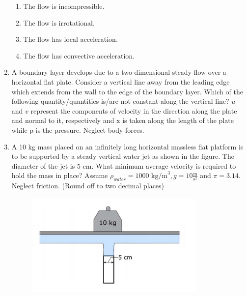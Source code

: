 \documentclass[a4paper,10pt]{article}
\begin{document}
\begin{enumerate}
\hfill{}
\begin{enumerate}
    \item The flow is incompressible.
    \item The flow is irrotational.
    \item The flow has local acceleration.
    \item The flow has convective acceleration.
\end{enumerate}

\item A boundary layer develops due to a two-dimensional steady flow over a horizontal flat plate. Consider a vertical line away from the leading edge which extends from the wall to the edge of the boundary layer. Which of the following quantity/quantities is/are not constant along the vertical line? $u$ and $v$ represent the components of velocity in the direction along the plate and normal to it, respectively and x is taken along the length of the plate while p is the pressure. Neglect body forces.

\hfill{}
\begin{enumerate}
\end{enumerate}

\item A 10 kg mass placed on an infinitely long horizontal massless flat platform is to be supported by a steady vertical water jet as shown in the figure. The diameter of the jet is 5 cm. What minimum average velocity is required to hold the mass in place? Assume $\rho_{water} = 1000 \text{ kg/m}^3, g = 10 \frac{\text{m}}{\text{s}^2}$ and $\pi = 3.14$. Neglect friction. (Round off to two decimal places)
\begin{figure}[H]
    \centering
    \includegraphics[width=0.5\columnwidth]{q30.png}
    \caption*{}
    \label{fig:q30}
\end{figure}


\end{enumerate}
\end{document}
